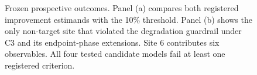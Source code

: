 \begin{figure}[htbp]
\begin{minipage}[t]{0.49\linewidth}
{}
\end{minipage}
\caption{Frozen prospective outcomes. Panel (a) compares both registered improvement estimands with the 10\% threshold. Panel (b) shows the only non-target site that violated the degradation guardrail under C3 and its endpoint-phase extensions. Site 6 contributes six observables. All four tested candidate models fail at least one registered criterion.}
\label{fig:prospective}
\end{figure}
